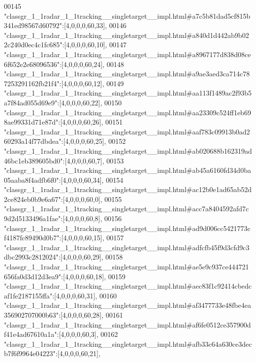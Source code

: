 \begin{DoxyCode}
00145 \textcolor{stringliteral}{"classgr\_1\_1radar\_1\_1tracking\_\_singletarget\_\_impl.html#a7c5b81dad5cf815b341ed98567d60792"}:[4,0,0,0,60,33],
00146 \textcolor{stringliteral}{"classgr\_1\_1radar\_1\_1tracking\_\_singletarget\_\_impl.html#a840d1d442ab9b022c240d0ec4c1fc685"}:[4,0,0,0,60,10],
00147 \textcolor{stringliteral}{"classgr\_1\_1radar\_1\_1tracking\_\_singletarget\_\_impl.html#a8967177d838d08ce6f652e2e68096536"}:[4,0,0,0,60,24],
00148 \textcolor{stringliteral}{"classgr\_1\_1radar\_1\_1tracking\_\_singletarget\_\_impl.html#a9ae3aed3ca714c787253291162fb21f4"}:[4,0,0,0,60,12],
00149 \textcolor{stringliteral}{"classgr\_1\_1radar\_1\_1tracking\_\_singletarget\_\_impl.html#aa113f1489ac2f93b5a7f84ad055d69e9"}:[4,0,0,0,60,22],
00150 \textcolor{stringliteral}{"classgr\_1\_1radar\_1\_1tracking\_\_singletarget\_\_impl.html#aa23309c524ff1eb698ae99331d71e87d"}:[4,0,0,0,60,26],
00151 \textcolor{stringliteral}{"classgr\_1\_1radar\_1\_1tracking\_\_singletarget\_\_impl.html#aaf783c09913b0ad260293a14f77dbdea"}:[4,0,0,0,60,25],
00152 \textcolor{stringliteral}{"classgr\_1\_1radar\_1\_1tracking\_\_singletarget\_\_impl.html#ab020688b162319ad46bc1eb389605bd0"}:[4,0,0,0,60,7],
00153 \textcolor{stringliteral}{"classgr\_1\_1radar\_1\_1tracking\_\_singletarget\_\_impl.html#ab45a6160fd34d0ba05aaba8f4adfb6f0"}:[4,0,0,0,60,34],
00154 \textcolor{stringliteral}{"classgr\_1\_1radar\_1\_1tracking\_\_singletarget\_\_impl.html#ac12b0e1ad65ab52d2ce824eb0b9e6a67"}:[4,0,0,0,60,0],
00155 \textcolor{stringliteral}{"classgr\_1\_1radar\_1\_1tracking\_\_singletarget\_\_impl.html#acc7a8404592afd7c9d2d5133496a1fae"}:[4,0,0,0,60,8],
00156 \textcolor{stringliteral}{"classgr\_1\_1radar\_1\_1tracking\_\_singletarget\_\_impl.html#ad9d006cc5421773cf4187fc89490d0b7"}:[4,0,0,0,60,15],
00157 \textcolor{stringliteral}{"classgr\_1\_1radar\_1\_1tracking\_\_singletarget\_\_impl.html#adfcfb45f9d3cfd9c3dbc2993c2812024"}:[4,0,0,0,60,29],
00158 \textcolor{stringliteral}{"classgr\_1\_1radar\_1\_1tracking\_\_singletarget\_\_impl.html#ae5e9c937ce444721656fa0d3d12d3ea9"}:[4,0,0,0,60,18],
00159 \textcolor{stringliteral}{"classgr\_1\_1radar\_1\_1tracking\_\_singletarget\_\_impl.html#aec83f1c92414cbedcaf1fe2187155ffa"}:[4,0,0,0,60,31],
00160 \textcolor{stringliteral}{"classgr\_1\_1radar\_1\_1tracking\_\_singletarget\_\_impl.html#af3477733e48fbe4ea356902707000b63"}:[4,0,0,0,60,28],
00161 \textcolor{stringliteral}{"classgr\_1\_1radar\_1\_1tracking\_\_singletarget\_\_impl.html#af6fe0512ce357900df41e4ad67610a1a"}:[4,0,0,0,60,3],
00162 \textcolor{stringliteral}{"classgr\_1\_1radar\_1\_1tracking\_\_singletarget\_\_impl.html#afb33c64a630ce3decb7f6f9964e04223"}:[4,0,0,0,60,21],

\end{DoxyCode}
